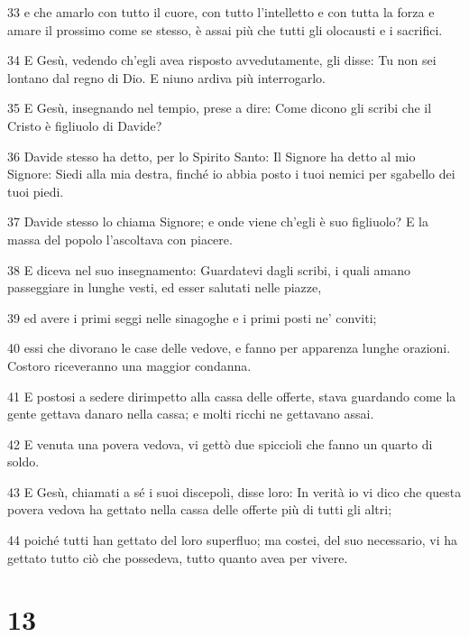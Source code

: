 \par 33 e che amarlo con tutto il cuore, con tutto l'intelletto e con tutta la forza e amare il prossimo come se stesso, è assai più che tutti gli olocausti e i sacrifici.
\par 34 E Gesù, vedendo ch'egli avea risposto avvedutamente, gli disse: Tu non sei lontano dal regno di Dio. E niuno ardiva più interrogarlo.
\par 35 E Gesù, insegnando nel tempio, prese a dire: Come dicono gli scribi che il Cristo è figliuolo di Davide?
\par 36 Davide stesso ha detto, per lo Spirito Santo: Il Signore ha detto al mio Signore: Siedi alla mia destra, finché io abbia posto i tuoi nemici per sgabello dei tuoi piedi.
\par 37 Davide stesso lo chiama Signore; e onde viene ch'egli è suo figliuolo? E la massa del popolo l'ascoltava con piacere.
\par 38 E diceva nel suo insegnamento: Guardatevi dagli scribi, i quali amano passeggiare in lunghe vesti, ed esser salutati nelle piazze,
\par 39 ed avere i primi seggi nelle sinagoghe e i primi posti ne' conviti;
\par 40 essi che divorano le case delle vedove, e fanno per apparenza lunghe orazioni. Costoro riceveranno una maggior condanna.
\par 41 E postosi a sedere dirimpetto alla cassa delle offerte, stava guardando come la gente gettava danaro nella cassa; e molti ricchi ne gettavano assai.
\par 42 E venuta una povera vedova, vi gettò due spiccioli che fanno un quarto di soldo.
\par 43 E Gesù, chiamati a sé i suoi discepoli, disse loro: In verità io vi dico che questa povera vedova ha gettato nella cassa delle offerte più di tutti gli altri;
\par 44 poiché tutti han gettato del loro superfluo; ma costei, del suo necessario, vi ha gettato tutto ciò che possedeva, tutto quanto avea per vivere.

\chapter{13}

